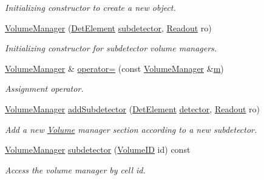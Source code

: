 \begin{DoxyCompactItemize}
\begin{DoxyCompactList}\small\item\em Initializing constructor to create a new object. \end{DoxyCompactList}\item 
\hyperlink{class_d_d4hep_1_1_geometry_1_1_volume_manager_ae1612218645bcd2734d83519d352aea9}{Volume\+Manager} (\hyperlink{class_d_d4hep_1_1_geometry_1_1_det_element}{Det\+Element} \hyperlink{class_d_d4hep_1_1_geometry_1_1_volume_manager_a2205b56a64279e2cba6345f8f7aab7ff}{subdetector}, \hyperlink{class_d_d4hep_1_1_geometry_1_1_readout}{Readout} ro)
\begin{DoxyCompactList}\small\item\em Initializing constructor for subdetector volume managers. \end{DoxyCompactList}\item 
\hyperlink{class_d_d4hep_1_1_geometry_1_1_volume_manager}{Volume\+Manager} \& \hyperlink{class_d_d4hep_1_1_geometry_1_1_volume_manager_ad81abecb3dd9f512683df8e41d84f2c9}{operator=} (const \hyperlink{class_d_d4hep_1_1_geometry_1_1_volume_manager}{Volume\+Manager} \&\hyperlink{_volumes_8cpp_a6fc379aaec47ce424b00d8ffda2a6c59}{m})
\begin{DoxyCompactList}\small\item\em Assignment operator. \end{DoxyCompactList}\item 
\hyperlink{class_d_d4hep_1_1_geometry_1_1_volume_manager}{Volume\+Manager} \hyperlink{class_d_d4hep_1_1_geometry_1_1_volume_manager_a6a9318986cf6574d07eaa86ea4da5085}{add\+Subdetector} (\hyperlink{class_d_d4hep_1_1_geometry_1_1_det_element}{Det\+Element} \hyperlink{class_d_d4hep_1_1_geometry_1_1_volume_manager_a0da5e3f504392edecef3b1f1f3c7b111}{detector}, \hyperlink{class_d_d4hep_1_1_geometry_1_1_readout}{Readout} ro)
\begin{DoxyCompactList}\small\item\em Add a new \hyperlink{class_d_d4hep_1_1_geometry_1_1_volume}{Volume} manager section according to a new subdetector. \end{DoxyCompactList}\item 
\hyperlink{class_d_d4hep_1_1_geometry_1_1_volume_manager}{Volume\+Manager} \hyperlink{class_d_d4hep_1_1_geometry_1_1_volume_manager_a2205b56a64279e2cba6345f8f7aab7ff}{subdetector} (\hyperlink{class_d_d4hep_1_1_geometry_1_1_volume_manager_ab1f746b561c93be38bc7c6e66fc8ca8a}{Volume\+ID} id) const
\begin{DoxyCompactList}\small\item\em Access the volume manager by cell id. \end{DoxyCompactList}\item 

\end{DoxyCompactItemize}
